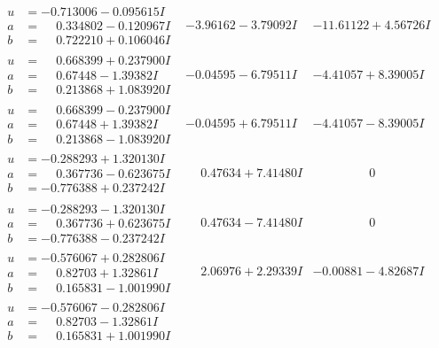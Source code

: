 \documentclass[1p]{elsarticle_modified}
\theoremstyle{definition}
\begin{document}
$$\begin{array}{c|c|c}
\begin{aligned}
u &= -0.713006 - 0.095615 I \\
a &= \phantom{-}0.334802 - 0.120967 I \\
b &= \phantom{-}0.722210 + 0.106046 I\end{aligned}
 & -3.96162 - 3.79092 I & -11.61122 + 4.56726 I \\ \hline\begin{aligned}
u &= \phantom{-}0.668399 + 0.237900 I \\
a &= \phantom{-}0.67448 - 1.39382 I \\
b &= \phantom{-}0.213868 + 1.083920 I\end{aligned}
 & -0.04595 - 6.79511 I & -4.41057 + 8.39005 I \\ \hline\begin{aligned}
u &= \phantom{-}0.668399 - 0.237900 I \\
a &= \phantom{-}0.67448 + 1.39382 I \\
b &= \phantom{-}0.213868 - 1.083920 I\end{aligned}
 & -0.04595 + 6.79511 I & -4.41057 - 8.39005 I \\ \hline\begin{aligned}
u &= -0.288293 + 1.320130 I \\
a &= \phantom{-}0.367736 - 0.623675 I \\
b &= -0.776388 + 0.237242 I\end{aligned}
 & \phantom{-}0.47634 + 7.41480 I & \phantom{-0.000000 } 0 \\ \hline\begin{aligned}
u &= -0.288293 - 1.320130 I \\
a &= \phantom{-}0.367736 + 0.623675 I \\
b &= -0.776388 - 0.237242 I\end{aligned}
 & \phantom{-}0.47634 - 7.41480 I & \phantom{-0.000000 } 0 \\ \hline\begin{aligned}
u &= -0.576067 + 0.282806 I \\
a &= \phantom{-}0.82703 + 1.32861 I \\
b &= \phantom{-}0.165831 - 1.001990 I\end{aligned}
 & \phantom{-}2.06976 + 2.29339 I & -0.00881 - 4.82687 I \\ \hline\begin{aligned}
u &= -0.576067 - 0.282806 I \\
a &= \phantom{-}0.82703 - 1.32861 I \\
b &= \phantom{-}0.165831 + 1.001990 I\end{aligned}

\end{array}$$
\end{document}
